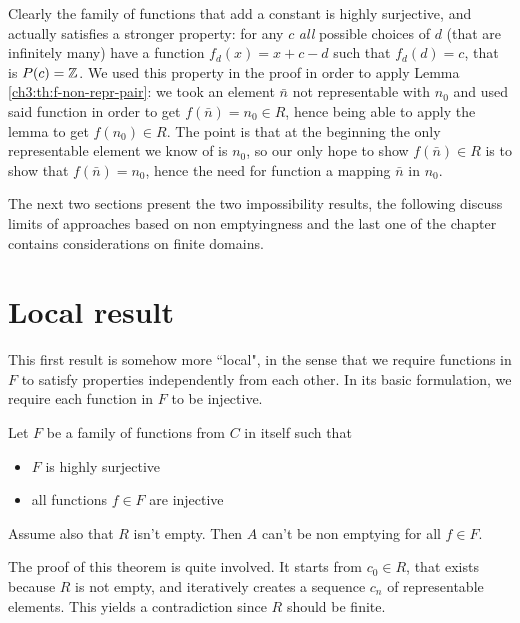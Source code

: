 Clearly the family of functions that add a constant is highly surjective, and actually satisfies a stronger property: for any $c$ \textit{all} possible choices of $d$ (that are infinitely many) have a function $f_d(x) = x + c - d$ such that $f_d(d) = c$, that is $P(c) = \mathbb{Z}$. We used this property in the proof in order to apply Lemma \ref{ch3:th:f-non-repr-pair}: we took an element $\bar{n}$ not representable with $n_0$ and used said function in order to get $f(\bar{n}) = n_0 \in R$, hence being able to apply the lemma to get $f(n_0) \in R$. The point is that at the beginning the only representable element we know of is $n_0$, so our only hope to show $f(\bar{n}) \in R$ is to show that $f(\bar{n}) = n_0$, hence the need for function a mapping $\bar{n}$ in $n_0$.

The next two sections present the two impossibility results, the following discuss limits of approaches based on non emptyingness and the last one of the chapter contains considerations on finite domains.

\section{Local result}
This first result is somehow more ``local", in the sense that we require functions in $F$ to satisfy properties independently from each other. In its basic formulation, we require each function in $F$ to be injective.

\begin{theorem}\label{ch4:th:non-empt-res-local-basic}
	Let $F$ be a family of functions from $C$ in itself such that
	\begin{itemize}
		\item $F$ is highly surjective
		\item all functions $f \in F$ are injective
	\end{itemize}
	Assume also that $R$ isn't empty. Then $A$ can't be non emptying for all $f \in F$.
\end{theorem}
The proof of this theorem is quite involved. It starts from $c_0 \in R$, that exists because $R$ is not empty, and iteratively creates a sequence $c_n$ of representable elements. This yields a contradiction since $R$ should be finite.

